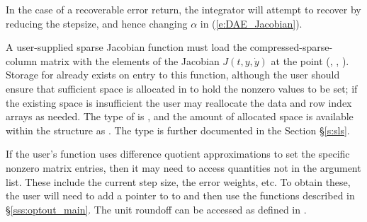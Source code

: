 {{  In the case of a recoverable error return, 
  the integrator will attempt to recover by reducing the stepsize,
  and hence changing $\alpha$ in (\ref{e:DAE_Jacobian}).
}
{
  A user-supplied sparse Jacobian function must load the
  compressed-sparse-column matrix  with the elements of the
  Jacobian $J(t,y,\dot{y})$ at the point (, , ).
  Storage for  already exists on entry to this function,
  although the user should ensure that sufficient space is allocated
  in  to hold the nonzero values to be set; if the existing
  space is insufficient the user may reallocate the data and row index
  arrays as needed.  The type of  is , and the
  amount of allocated space is available within the 
  structure as .  The  type is further documented
  in the Section \S\ref{s:sls}. 
 
  If the user's  function uses difference quotient
  approximations to set the specific nonzero matrix entries, then it
  may need to access quantities not in the argument list. These
  include the current step size, the error weights, etc.
  To obtain these, the user will need to add a pointer to  
  to  and then use the  functions described in
  \S\ref{sss:optout_main}. The unit roundoff can be accessed as
   defined in .
}
}
